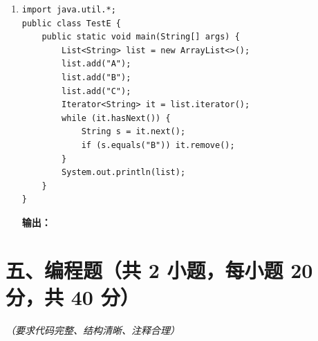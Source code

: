 \documentclass[a3paper, landscape, 11pt, twocolumn]{article}
\begin{document}
\begin{enumerate}[label=\arabic*., itemsep=1em]
	\item
	      \begin{lstlisting}[style=JavaExam]
import java.util.*;
public class TestE {
    public static void main(String[] args) {
        List<String> list = new ArrayList<>();
        list.add("A");
        list.add("B");
        list.add("C");
        Iterator<String> it = list.iterator();
        while (it.hasNext()) {
            String s = it.next();
            if (s.equals("B")) it.remove();
        }
        System.out.println(list);
    }
}
\end{lstlisting}
	      \textbf{输出：}\underline{\hspace{5cm}}
\end{enumerate}

\newpage

\section*{五、编程题（共 2 小题，每小题 20 分，共 40 分）}
\textit{（要求代码完整、结构清晰、注释合理）}
\end{document}
